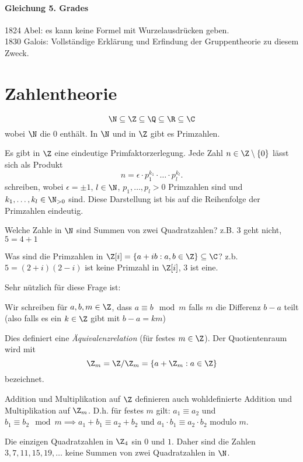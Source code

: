 \paragraph{Gleichung 5. Grades}
1824 Abel: es kann keine Formel mit Wurzelausdrücken geben.\\
1830 Galois: Vollständige Erklärung und Erfindung der Gruppentheorie zu diesem Zweck.

\section{Zahlentheorie}
\[
\N \subseteq \Z \subseteq \Q \subseteq \R \subseteq \C
\] 
wobei $\N$ die $0$ enthält. In $\N$ und in $\Z$ gibt es Primzahlen.
\begin{theorem}
	Es gibt in $\Z$ eine eindeutige Primfaktorzerlegung.
	Jede Zahl $n \in \Z \setminus \{0\}$ lässt sich als Produkt
	\[
	n = \epsilon \cdot p_1^{k_1} \cdot \ldots \cdot p_{l}^{k_{l}}
	.\] 
	schreiben, wobei $\epsilon = \pm 1$, $l \in \N$, $p_1,\ldots,p_{l} > 0$ Primzahlen sind und $k_1,\ldots,k_{l} \in \N_{> 0}$ sind.
	Diese Darstellung ist bis auf die Reihenfolge der Primzahlen eindeutig.
\end{theorem}

Welche Zahle in $\N$ sind Summen von zwei Quadratzahlen?
z.B. $3$ geht nicht, $5 = 4+1$

Was sind die Primzahlen in $\Z[i] = \{a + ib: a,b \in \Z\} \subseteq \C$?
z.b. $5 = (2+i)(2-i)$ ist keine Primzahl in $\Z[i]$, $3$ ist eine.

Sehr nützlich für diese Frage ist:
\begin{definition}
	Wir schreiben für $a,b,m \in \Z$, dass $a \equiv b \mod m$ falls $m$ die Differenz $b-a$ teilt (also falls es ein  $k \in \Z$ gibt mit $b-a = k m $)
\end{definition}

Dies definiert eine \emph{Äquivalenzrelation} (für festes $m \in \Z$).
Der Quotientenraum wird mit 
\[
	\Z_{m} = \Z / \Z_{m} = \{a + \Z_{m}: a \in \Z\} 
\]
bezeichnet.

\begin{lemma}
	Addition und Multiplikation auf $\Z$ definieren auch wohldefinierte Addition und Multiplikation auf $\Z_{m}$.
	D.h. für festes $m$ gilt: $a_1 \equiv a_2$ und $b_1 \equiv b_2 \mod m \implies a_1 + b_1 \equiv a_2 + b_2$ und $a_1 \cdot b_1 \equiv a_2 \cdot b_2$ modulo $m$.
\end{lemma}


\begin{lemma}
	Die einzigen Quadratzahlen in $\Z_4$ sin $0$ und $1$.
	Daher sind die Zahlen $3,7,11,15,19,\ldots$ keine Summen von zwei Quadratzahlen in $\N$.
\end{lemma}



